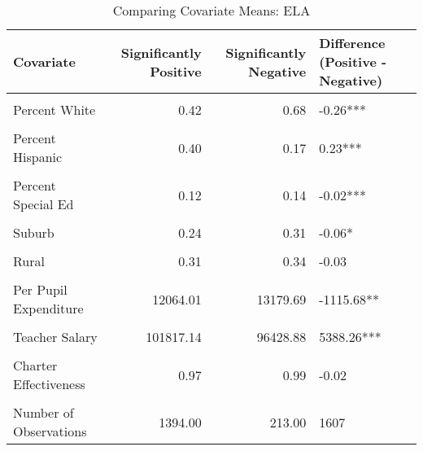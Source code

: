 \begin{table}[!h]
\centering
\caption{\label{tab:cov_means_ela}Comparing Covariate Means: ELA}
\centering
\begin{tabular}[t]{lrrl}
\toprule
Covariate & Significantly 
 Positive & Significantly 
 Negative & Difference 
 (Positive - Negative)\\
\midrule
\cellcolor{gray!10}{Log of Enrollment} & \cellcolor{gray!10}{8.20} & \cellcolor{gray!10}{7.74} & \cellcolor{gray!10}{0.47***}\\
Percent White & 0.42 & 0.68 & -0.26***\\
\cellcolor{gray!10}{Percent Black} & \cellcolor{gray!10}{0.07} & \cellcolor{gray!10}{0.11} & \cellcolor{gray!10}{-0.04***}\\
Percent Hispanic & 0.40 & 0.17 & 0.23***\\
\cellcolor{gray!10}{Percent Free/Reduced Lunch} & \cellcolor{gray!10}{0.58} & \cellcolor{gray!10}{0.50} & \cellcolor{gray!10}{0.08***}\\
Percent Special Ed & 0.12 & 0.14 & -0.02***\\
\cellcolor{gray!10}{Urban} & \cellcolor{gray!10}{0.20} & \cellcolor{gray!10}{0.10} & \cellcolor{gray!10}{0.1***}\\
Suburb & 0.24 & 0.31 & -0.06*\\
\cellcolor{gray!10}{Town} & \cellcolor{gray!10}{0.25} & \cellcolor{gray!10}{0.25} & \cellcolor{gray!10}{0}\\
Rural & 0.31 & 0.34 & -0.03\\
\cellcolor{gray!10}{Per Pupil Revenue} & \cellcolor{gray!10}{12258.61} & \cellcolor{gray!10}{13020.99} & \cellcolor{gray!10}{-762.38*}\\
Per Pupil Expenditure & 12064.01 & 13179.69 & -1115.68**\\
\cellcolor{gray!10}{Student-Teacher Ratio} & \cellcolor{gray!10}{18.22} & \cellcolor{gray!10}{16.14} & \cellcolor{gray!10}{2.08***}\\
Teacher Salary & 101817.14 & 96428.88 & 5388.26***\\
\cellcolor{gray!10}{Number of Magnet Schools} & \cellcolor{gray!10}{0.56} & \cellcolor{gray!10}{0.50} & \cellcolor{gray!10}{0.06}\\
Charter Effectiveness & 0.97 & 0.99 & -0.02\\
\cellcolor{gray!10}{Baseline Performance} & \cellcolor{gray!10}{-0.51} & \cellcolor{gray!10}{-0.05} & \cellcolor{gray!10}{-0.46***}\\
\midrule
Number of Observations & 1394.00 & 213.00 & 1607\\
\bottomrule
\end{tabular}
\end{table}
